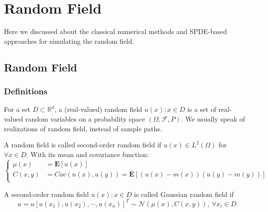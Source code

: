 \chapter{Random Field}\label{cap5}
Here we discussed about the classical numerical methods and SPDE-based approaches for simulating the random field.
\section{Random Field}
\subsection{Definitions}
\begin{definition}
    For a set $D\subset \mathbb{R}^d$, a (real-valued) random field ${u(x):x\in D}$ is a set of real-valued 
    random variables on a probability space $(\Omega, \mathcal{F}, P)$. We usually speak of realizations of random field, instead of sample paths. 
\end{definition}

\begin{definition}
    A random field is called second-order random field if $u(x)\in L^2(\Omega)$ for $\forall x\in D$. With its mean and covariance function:
    \begin{equation}\left\{
        \begin{aligned}
            \mu(x) &= \mathbf{E}[u(x)]\\
            C(x, y) &= Cov(u(x), u(y))=\mathbf{E}[(u(x)-m(x))(u(y)-m(y))]\\
        \end{aligned}\right.
    \end{equation}
\end{definition}

\begin{definition}
    A second-order random field ${u(x):x\in D}$ is called Gaussian random field if 
    \begin{equation}
        u = u[u(x_1), u(x_2), \cdots, u(x_n)]^T \sim \mathcal{N}(\mu(x), C(x, y)),\ \forall x_i \in D
    \end{equation}
\end{definition}

